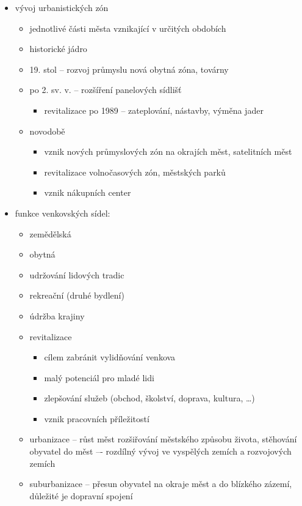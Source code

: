 \begin{itemize}
\begin{itemize}
	\end{itemize}
\item vývoj urbanistických zón	
	\begin{itemize}
	\item jednotlivé části města vznikající v určitých obdobích
	\item historické jádro
	\item 19. stol -- rozvoj průmyslu \ra nová obytná zóna, továrny
	\item po 2. sv. v. -- rozšíření panelových sídlišť
		\begin{itemize}
		\item revitalizace po 1989 -- zateplování, nástavby, výměna jader
		\end{itemize}
	\item novodobě
		\begin{itemize}
		\item vznik nových průmyslových zón na okrajích měst, satelitních měst
		\item revitalizace volnočasových zón, městských parků
		\item vznik nákupních center
		\end{itemize}
	\end{itemize}
	\item funkce venkovských sídel:
		\begin{itemize}
		\item zemědělská
		\item obytná
		\item udržování lidových tradic
		\item rekreační (druhé bydlení)
		\item údržba krajiny
		\item revitalizace
			\begin{itemize}
			\item cílem zabránit vylidňování venkova
			\item malý potenciál pro mladé lidi 
			\item[\ra] zlepšování služeb (obchod, školství, doprava, kultura, \ldots)
			\item[\ra] vznik pracovních příležitostí
			\end{itemize}
		\item urbanizace -- růst měst rozšiřování městského způsobu života, stěhování obyvatel do měst –- rozdílný vývoj ve vyspělých zemích a  rozvojových zemích
		\item suburbanizace -- přesun obyvatel na okraje měst a do blízkého zázemí, důležité je dopravní spojení
		\end{itemize}
\end{itemize}



